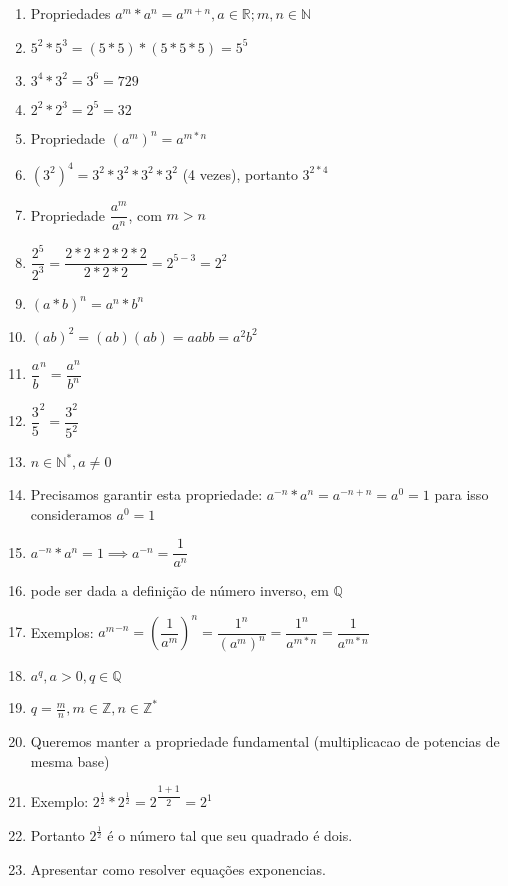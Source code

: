 \documentclass{article}
\begin{document}
\begin{enumerate}
\item Propriedades $a^m * a^n = a^{m+n}, a \in \mathbb{R}; m,n \in \mathbb{N}$
\item $5^2 * 5^3 = (5*5)*(5*5*5) = 5^5$ 
\item $3^4 * 3^2 = 3^6 = 729$
\item $2^2 * 2^3 = 2^5 = 32$
\item Propriedade $(a^m)^n = a^{m*n}$
\item $({3^2})^4 = 3^2 * 3^2 *3^2 *3^2 $ (4 vezes), portanto $3^{2*4}$
\item Propriedade $\dfrac{a^m}{a^n}$, com $m > n$
\item $\dfrac{2^5}{2^3} = \dfrac{2*2*2*2*2}{2*2*2} = 2^{5-3} = 2^2$
\item $(a*b)^n = a^n * b^n$
\item $(ab)^2 = (ab)(ab) = aabb = a^2 b^2$
\item $\dfrac{a}{b}^n = \dfrac{a^n}{b^n}$
\item $\dfrac{3}{5}^2 = \dfrac{3^2}{5^2}$
    \item $n \in \mathbb{N}^* , a\neq 0$
    \item Precisamos garantir esta propriedade: $a^{-n} * a^n = a^{-n+n} = a^0 = 1$ para isso consideramos $a^0 = 1$
    \item $a^{-n} * a^n = 1 \implies a^{-n} = \dfrac{1}{a^n}$
    \item pode ser dada a definição de número inverso, em $\mathbb{Q}$
    \item Exemplos: ${a^m}^{-n} = \left({\dfrac{1}{a^m}}\right)^n = \dfrac{1^n}{({a^m})^n} = \dfrac{1^n}{a^{m*n}} = \dfrac{1}{a^{m*n}}$

\item $a^q, a > 0, q \in \mathbb{Q}$
\item $q = \frac{m}{n}, m \in \mathbb{Z}, n \in \mathbb{Z}^*$
\item Queremos manter a propriedade fundamental (multiplicacao de potencias de mesma base)
\item Exemplo: $2^{\frac{1}{2}} * 2^{\frac{1}{2}} = 2^{\dfrac{1+1}{2}} = 2^1$
\item Portanto $2^{\frac{1}{2}}$ é o número tal que seu quadrado é dois.
\item Apresentar como resolver equações exponencias.
\end{enumerate}
\end{document}
